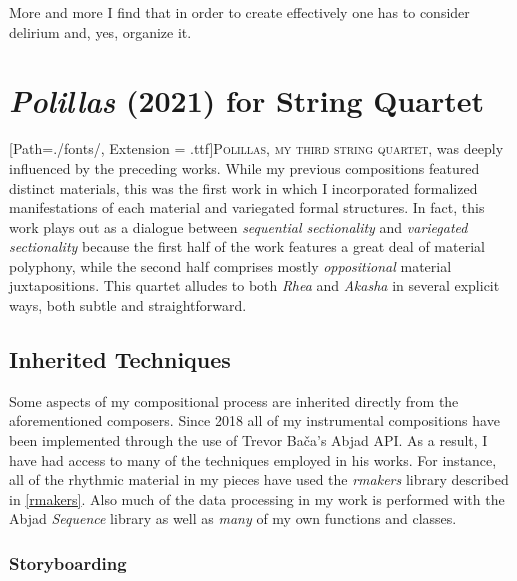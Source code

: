 \begin{savequote}[75mm]
More and more I find that in order to create effectively one has to consider delirium and, yes, organize it.
\end{savequote}

\chapter{\textit{Polillas} (2021) for String Quartet}
\label{Chapter3}

\lettrine[lines=3]{\setmainfont{GoudyInitialen}[Path=./fonts/, Extension = .ttf]\color{printGreen}P}{olillas, my third string quartet,} was deeply influenced by the preceding works. While my previous compositions featured distinct materials, this was the first work in which I incorporated formalized manifestations of each material and variegated formal structures. In fact, this work plays out as a dialogue between \textit{sequential sectionality} and \textit{variegated sectionality} because the first half of the work features a great deal of material polyphony, while the second half comprises mostly \textit{oppositional} material juxtapositions. This quartet alludes to both \textit{Rhea} and \textit{Akasha} in several explicit ways, both subtle and straightforward.


\section{Inherited Techniques}

Some aspects of my compositional process are inherited directly from the aforementioned composers. Since 2018 all of my instrumental compositions have been implemented through the use of Trevor Bača's Abjad \ac{API}. As a result, I have had access to many of the techniques employed in his works. For instance, all of the rhythmic material in my pieces have used the \textit{rmakers} library described in \vref{rmakers}. Also much of the data processing in my work is performed with the Abjad \textit{Sequence} library as well as \emph{many} of my own functions and classes.

\subsection{Storyboarding}

